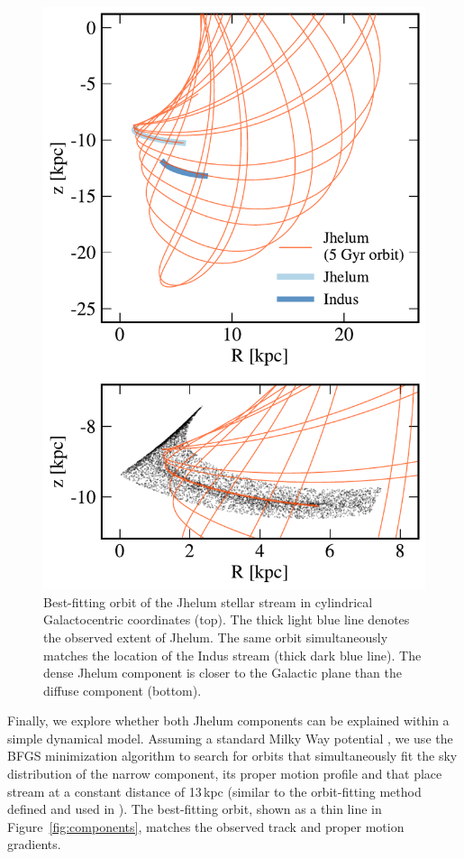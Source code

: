 \documentclass[twocolumn]{aastex62}
\begin{document}
\begin{figure}
\begin{center}
\includegraphics[width=\columnwidth]{orbit_cyl.pdf}
\end{center}
\caption{
Best-fitting orbit of the Jhelum stellar stream in cylindrical Galactocentric coordinates (top).
The thick light blue line denotes the observed extent of Jhelum.
The same orbit simultaneously matches the location of the Indus stream (thick dark blue line).
The dense Jhelum component is closer to the Galactic plane than the diffuse component (bottom).
}
\label{fig:galactocentric}
\end{figure}

Finally, we explore whether both Jhelum components can be explained within a simple dynamical model.
Assuming a standard Milky Way potential \citep{gala}, we use the BFGS minimization algorithm to search for orbits that simultaneously fit the sky distribution of the narrow component, its proper motion profile and that place stream at a constant distance of 13\,kpc (similar to the orbit-fitting method defined and used in \citealt{pwb}).
The best-fitting orbit, shown as a thin line in Figure~\ref{fig:components}, matches the observed track and proper motion gradients.
\end{document}
